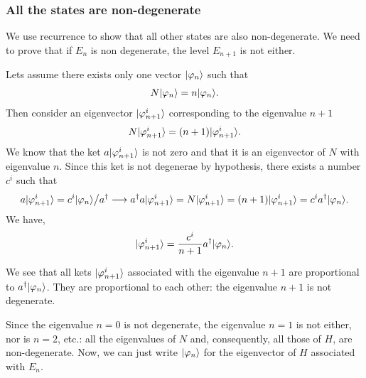 \subsubsection{All the states are non-degenerate}
We use recurrence to show that all other states are also non-degenerate. We need to prove that if $E_n$ is non degenerate, the level $E_{n+1}$ is 
not either.

Lets assume there exists only one vector $|\varphi_n\rangle$ such that 
\begin{align*}
    N|\varphi_n\rangle=n|\varphi_n\rangle.
\end{align*}
Then consider an eigenvector $|\varphi_{n+1}^i\rangle$ corresponding to the eigenvalue $n+1$
\begin{align*}
    N|\varphi_{n+1}^i\rangle=(n+1)|\varphi_{n+1}^i\rangle.
\end{align*}
We know that the ket $a|\varphi_{n+1}^i\rangle$ is not zero and that it is an eigenvector of $N$ with eigenvalue $n$. Since this ket 
is not degenerae by hypothesis, there exists a number $c^i$ such that 
\begin{align*}
    a|\varphi_{n+1}^i\rangle=c^i|\varphi_n\rangle\bigr/a^\dagger\longrightarrow a^\dagger a|\varphi_{n+1}^i\rangle=N|\varphi_{n+1}^i\rangle=(n+1)|\varphi_{n+1}^i\rangle=c^ia^\dagger|\varphi_n\rangle.
\end{align*}
We have, 
\begin{align*}
    |\varphi_{n+1}^i\rangle=\frac{c^i}{n+1}a^\dagger|\varphi_n\rangle.
\end{align*}

We see that all kets $|\varphi_{n+1}^i\rangle$ associated with the eigenvalue $n+1$ are proportional to $a^\dagger|\varphi_n\rangle$.
They are proportional to each other: the eigenvalue $n+1$ is not degenerate.

Since the eigenvalue $n=0$ is not degenerate, the eigenvalue $n=1$ is not either, nor is $n=2$, etc.: all the eigenvalues of $N$ and, consequently,
all those of $H$, are non-degenerate. Now, we can just write $|\varphi_n\rangle$ for the eigenvector of $H$ associated with $E_n$.